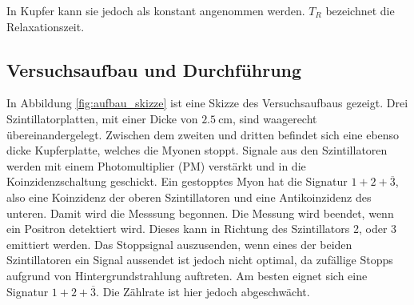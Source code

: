 \documentclass[a4paper,ngerman]{scrartcl}
\begin{document}
In Kupfer kann sie jedoch als konstant angenommen werden. $T_R$ bezeichnet die Relaxationszeit.
	
\clearpage

\subsection{Versuchsaufbau und Durchführung}

In Abbildung \ref{fig:aufbau_skizze} ist eine Skizze des Versuchsaufbaus gezeigt. Drei Szintillatorplatten, mit einer Dicke von $\SI{2.5}{\centi\meter}$, sind waagerecht übereinandergelegt. Zwischen dem zweiten und dritten befindet sich eine ebenso dicke Kupferplatte, welches die Myonen stoppt. 
Signale aus den Szintillatoren werden mit einem Photomultiplier (PM) verstärkt und in die Koinzidenzschaltung geschickt.
Ein gestopptes Myon hat die Signatur $1 + 2 + \overline{3}$, also eine Koinzidenz der oberen Szintillatoren und eine Antikoinzidenz des unteren. Damit wird die Messsung begonnen. Die Messung wird beendet, wenn ein Positron detektiert wird. Dieses kann in Richtung des Szintillators 2, oder 3 emittiert werden. Das Stoppsignal auszusenden, wenn eines der beiden Szintillatoren ein Signal aussendet ist jedoch nicht optimal, da zufällige Stopps aufgrund von Hintergrundstrahlung auftreten. Am besten eignet sich eine Signatur $1 + 2 + \overline{3}$. Die Zählrate ist hier jedoch abgeschwächt.  
\end{document}
